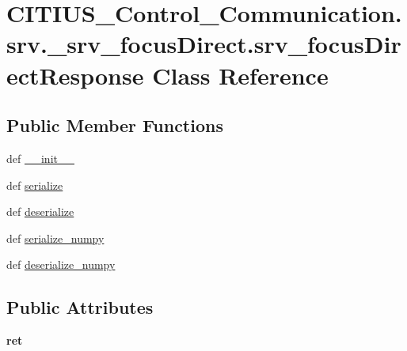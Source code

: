 \hypertarget{class_c_i_t_i_u_s___control___communication_1_1srv_1_1__srv__focus_direct_1_1srv__focus_direct_response}{\section{\-C\-I\-T\-I\-U\-S\-\_\-\-Control\-\_\-\-Communication.\-srv.\-\_\-srv\-\_\-focus\-Direct.\-srv\-\_\-focus\-Direct\-Response \-Class \-Reference}
\label{class_c_i_t_i_u_s___control___communication_1_1srv_1_1__srv__focus_direct_1_1srv__focus_direct_response}
}
\subsection*{\-Public \-Member \-Functions}
\begin{DoxyCompactItemize}
\item 
def \hyperlink{class_c_i_t_i_u_s___control___communication_1_1srv_1_1__srv__focus_direct_1_1srv__focus_direct_response_a0b10f59c4af774cfcbdcb59211eb2c86}{\-\_\-\-\_\-init\-\_\-\-\_\-}
\item 
def \hyperlink{class_c_i_t_i_u_s___control___communication_1_1srv_1_1__srv__focus_direct_1_1srv__focus_direct_response_a417bb89c025b58b56be6b3ad16bd6ed2}{serialize}
\item 
def \hyperlink{class_c_i_t_i_u_s___control___communication_1_1srv_1_1__srv__focus_direct_1_1srv__focus_direct_response_af5b8520831fe008968cebe12fa819d60}{deserialize}
\item 
def \hyperlink{class_c_i_t_i_u_s___control___communication_1_1srv_1_1__srv__focus_direct_1_1srv__focus_direct_response_a1e17c8a584256053c7025e71c5fc5d4c}{serialize\-\_\-numpy}
\item 
def \hyperlink{class_c_i_t_i_u_s___control___communication_1_1srv_1_1__srv__focus_direct_1_1srv__focus_direct_response_a2e06c47349e3c6a0816dfecabd2a43c5}{deserialize\-\_\-numpy}
\end{DoxyCompactItemize}
\subsection*{\-Public \-Attributes}
\begin{DoxyCompactItemize}
\item 
\hypertarget{class_c_i_t_i_u_s___control___communication_1_1srv_1_1__srv__focus_direct_1_1srv__focus_direct_response_a33767d5e5d9c10f45184ed5e8a7a5a38}{{\bfseries ret}}\label{class_c_i_t_i_u_s___control___communication_1_1srv_1_1__srv__focus_direct_1_1srv__focus_direct_response_a33767d5e5d9c10f45184ed5e8a7a5a38}

\end{DoxyCompactItemize}
